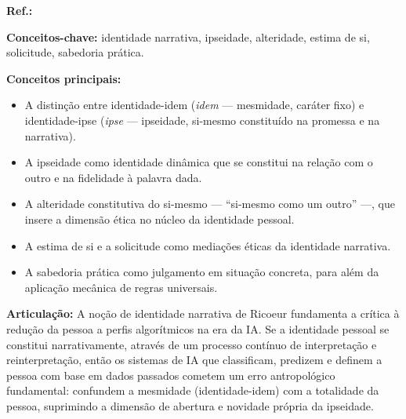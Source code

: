 \begin{fichamento}
    \textbf{Ref.:} \cite{Ricoeur1990SM}
    
    \textbf{Conceitos-chave:} identidade narrativa, ipseidade, alteridade, estima de si, solicitude, sabedoria prática.
    
    \textbf{Conceitos principais:}
    \begin{itemize}
        \item A distinção entre identidade-idem (\textit{idem} — mesmidade, caráter fixo) e identidade-ipse (\textit{ipse} — ipseidade, si-mesmo constituído na promessa e na narrativa).
        \item A ipseidade como identidade dinâmica que se constitui na relação com o outro e na fidelidade à palavra dada.
        \item A alteridade constitutiva do si-mesmo — ``si-mesmo como um outro'' —, que insere a dimensão ética no núcleo da identidade pessoal.
        \item A estima de si e a solicitude como mediações éticas da identidade narrativa.
        \item A sabedoria prática como julgamento em situação concreta, para além da aplicação mecânica de regras universais.
    \end{itemize}
    
    \textbf{Articulação:} A noção de identidade narrativa de Ricoeur fundamenta a crítica à redução da pessoa a perfis algorítmicos na era da IA. Se a identidade pessoal se constitui narrativamente, através de um processo contínuo de interpretação e reinterpretação, então os sistemas de IA que classificam, predizem e definem a pessoa com base em dados passados cometem um erro antropológico fundamental: confundem a mesmidade (identidade-idem) com a totalidade da pessoa, suprimindo a dimensão de abertura e novidade própria da ipseidade.
\end{fichamento}

